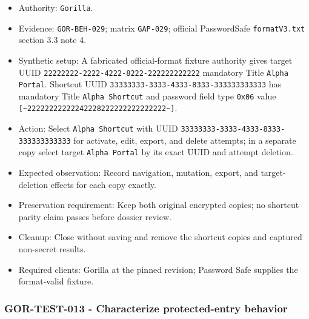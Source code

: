 \documentclass[
  letterpaper,
]{article}
\newcommand{\passthrough}[1]{#1}
\providecommand{\tightlist}{%
  \setlength{\itemsep}{0pt}\setlength{\parskip}{0pt}}
\begin{document}
\begin{itemize}
\tightlist
\item
  Authority: \passthrough{\lstinline!Gorilla!}.
\item
  Evidence: \nolinkurl{GOR-BEH-029}; matrix \passthrough{\lstinline!GAP-029!}; official PasswordSafe
  \nolinkurl{formatV3.txt} section 3.3 note 4.
\item
  Synthetic setup: A fabricated official-format fixture authority gives target UUID
  \nolinkurl{22222222-2222-4222-8222-222222222222} mandatory Title \passthrough{\lstinline!Alpha Portal!}. Shortcut UUID
  \nolinkurl{33333333-3333-4333-8333-333333333333} has mandatory Title \passthrough{\lstinline!Alpha Shortcut!} and
  password field type \passthrough{\lstinline!0x06!} value \nolinkurl{[~22222222222242228222222222222222~]}.
\item
  Action: Select \passthrough{\lstinline!Alpha Shortcut!} with UUID \nolinkurl{33333333-3333-4333-8333-333333333333} for
  activate, edit, export, and delete attempts; in a separate copy select target \passthrough{\lstinline!Alpha Portal!}
  by its exact UUID and attempt deletion.
\item
  Expected observation: Record navigation, mutation, export, and target-deletion effects for each copy exactly.
\item
  Preservation requirement: Keep both original encrypted copies; no shortcut parity claim passes before dossier review.
\item
  Cleanup: Close without saving and remove the shortcut copies and captured non-secret results.
\item
  Required clients: Gorilla at the pinned revision; Password Safe supplies the format-valid fixture.
\end{itemize}

\subsubsection{GOR-TEST-013 - Characterize protected-entry
behavior}\label{gor-test-013---characterize-protected-entry-behavior}
\end{document}

